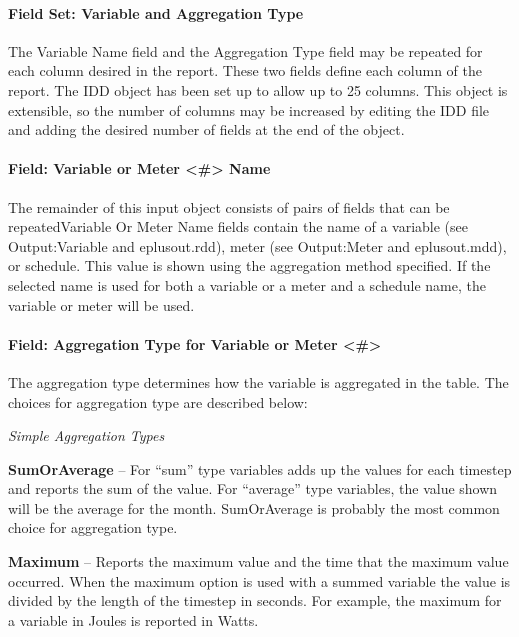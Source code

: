 \paragraph{Field Set: Variable and Aggregation Type}\label{field-set-variable-and-aggregation-type}

The Variable Name field and the Aggregation Type field may be repeated for each column desired in the report. These two fields define each column of the report. The IDD object has been set up to allow up to 25 columns. This object is extensible, so the number of columns may be increased by editing the IDD file and adding the desired number of fields at the end of the object.

\paragraph{Field: Variable or Meter \textless{}\#\textgreater{} Name}\label{field-variable-or-meter-name}

The remainder of this input object consists of pairs of fields that can be repeatedVariable Or Meter Name fields contain the name of a variable (see Output:Variable and eplusout.rdd), meter (see Output:Meter and eplusout.mdd), or schedule. This value is shown using the aggregation method specified. If the selected name is used for both a variable or a meter and a schedule name, the variable or meter will be used.

\paragraph{Field: Aggregation Type for Variable or Meter \textless{}\#\textgreater{}}\label{field-aggregation-type-for-variable-or-meter}

The aggregation type determines how the variable is aggregated in the table. The choices for aggregation type are described below:

\emph{Simple Aggregation Types}

\textbf{SumOrAverage} -- For ``sum'' type variables adds up the values for each timestep and reports the sum of the value. For ``average'' type variables, the value shown will be the average for the month. SumOrAverage is probably the most common choice for aggregation type.

\textbf{Maximum} -- Reports the maximum value and the time that the maximum value occurred. When the maximum option is used with a summed variable the value is divided by the length of the timestep in seconds. For example, the maximum for a variable in Joules is reported in Watts.

